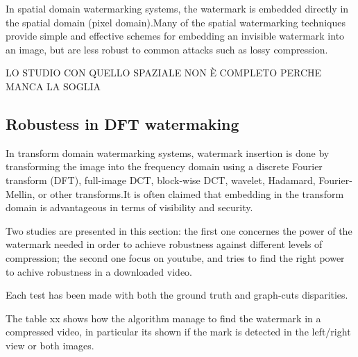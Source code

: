 In spatial domain watermarking systems, the watermark is embedded directly in the spatial domain (pixel domain).\newline  Many of the spatial watermarking techniques provide simple and effective schemes for embedding an invisible watermark into an image, but are less robust to common attacks such as lossy compression.

LO STUDIO CON QUELLO SPAZIALE NON È COMPLETO PERCHE MANCA LA SOGLIA

\subsection{Robustess in DFT watermaking}

In transform domain watermarking systems, watermark insertion is done by transforming the image into the frequency domain using a discrete Fourier transform (DFT), full-image DCT, block-wise DCT, wavelet, Hadamard, Fourier-Mellin, or other transforms.\newline  It is often claimed that embedding in the transform domain is advantageous in terms of visibility and security.\newline 

Two studies are presented in this section: the first one concernes the power of the watermark needed in order to achieve robustness against different levels of compression; the second one focus on youtube, and tries to find the right power to achive robustness in a downloaded video.\newline 

Each test has been made with both the ground truth and graph-cuts disparities.\newline 

The table xx shows how the algorithm manage to find the watermark in a compressed video, in particular its shown if the mark is detected in the left/right view or both images.


\begin{table}[htbp]
 \label{Tab:compgt}
 \begin{center}
 \caption{}
 \end{center}
 \end{table}
 
